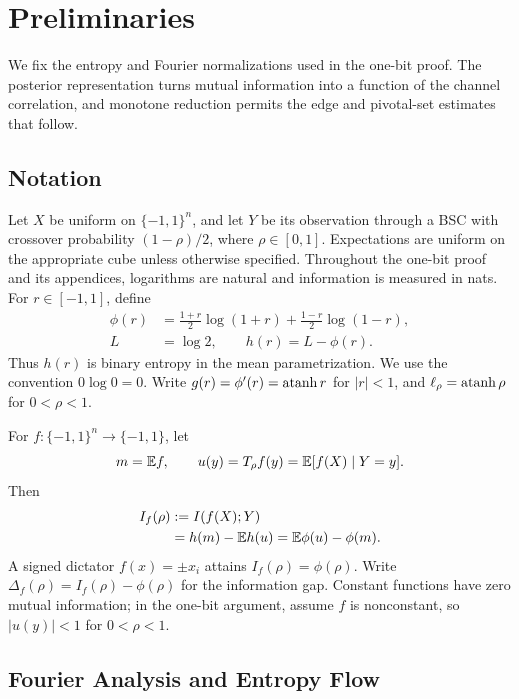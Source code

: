 \section{Preliminaries}
\label{sec:mechanism}

We fix the entropy and Fourier normalizations used in the one-bit proof.
The posterior representation turns mutual information into a function of
the channel correlation, and monotone reduction permits the edge and
pivotal-set estimates that follow.

\subsection{Notation}

Let \(X\) be uniform on \(\{-1,1\}^n\), and let \(Y\) be its
observation through a BSC with crossover probability \((1-\rho)/2\),
where \(\rho\in[0,1]\). Expectations are uniform on the appropriate
cube unless otherwise specified. Throughout the one-bit proof and its
appendices, logarithms are natural and information is measured in nats.
For \(r\in[-1,1]\), define
\begin{align*}
 \phi(r)&=\frac{1+r}{2}\log(1+r)
          +\frac{1-r}{2}\log(1-r),\\
 L&=\log2,\qquad h(r)=L-\phi(r).
\end{align*}
Thus \(h(r)\) is binary entropy in the mean parametrization.
We use the convention \(0\log0=0\).
Write \(g(r)=\phi'(r)=\operatorname{atanh} r\) for \(|r|<1\), and
\(\ell_\rho=\operatorname{atanh}\rho\) for \(0<\rho<1\).

For \(f:\{-1,1\}^n\to\{-1,1\}\), let
\[
 m=\mathbb E f,\qquad u(y)=T_\rho f(y)=\mathbb E[f(X)\mid Y=y].
\]
Then
\begin{equation}
 \begin{aligned}
 I_f(\rho)&:=I(f(X);Y)\\
 &=h(m)-\mathbb E h(u)=\mathbb E\phi(u)-\phi(m).
 \end{aligned}
 \label{eq:posterior-information}
\end{equation}
A signed dictator \(f(x)=\pm x_i\) attains \(I_f(\rho)=\phi(\rho)\).
Write \(\Delta_f(\rho)=I_f(\rho)-\phi(\rho)\) for the information gap.
Constant functions have zero mutual information; in the one-bit argument, assume
\(f\) is nonconstant, so \(|u(y)|<1\) for \(0<\rho<1\).

\subsection{Fourier Analysis and Entropy Flow}

